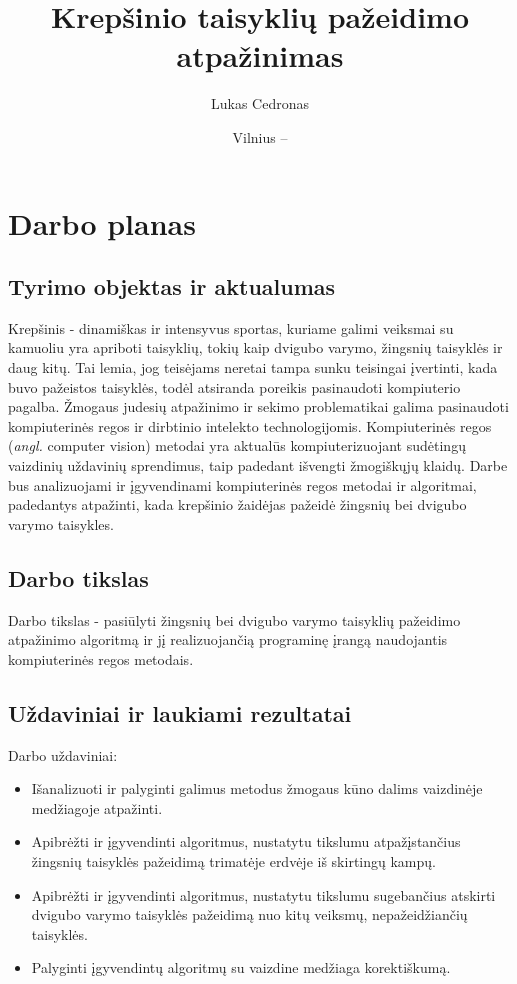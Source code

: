 \documentclass{VUMIFPSbakalaurinis}
\institute{Informatikos institutas}  %
\title{Krepšinio taisyklių pažeidimo atpažinimas}
\author{Lukas Cedronas}
\date{Vilnius – \the\year}
\begin{document}
\maketitle


\section{Darbo planas}

\subsection{Tyrimo objektas ir aktualumas}
Krepšinis - dinamiškas ir intensyvus sportas, kuriame galimi veiksmai su kamuoliu yra apriboti taisyklių, tokių kaip dvigubo varymo, žingsnių taisyklės ir daug kitų. Tai lemia, jog teisėjams neretai tampa sunku teisingai įvertinti, kada buvo pažeistos taisyklės, todėl atsiranda poreikis pasinaudoti kompiuterio pagalba. Žmogaus judesių atpažinimo ir sekimo problematikai galima pasinaudoti kompiuterinės regos ir dirbtinio intelekto technologijomis. Kompiuterinės regos (\textit{angl.} computer vision) metodai yra aktualūs kompiuterizuojant sudėtingų vaizdinių uždavinių sprendimus, taip padedant išvengti žmogiškųjų klaidų. Darbe bus analizuojami ir įgyvendinami kompiuterinės regos metodai ir algoritmai, padedantys atpažinti, kada krepšinio žaidėjas pažeidė žingsnių bei dvigubo varymo taisykles. 

\subsection{Darbo tikslas}
Darbo tikslas - pasiūlyti žingsnių bei dvigubo varymo taisyklių pažeidimo atpažinimo algoritmą ir jį realizuojančią programinę įrangą naudojantis kompiuterinės regos metodais.

\subsection{Uždaviniai ir laukiami rezultatai}
Darbo uždaviniai:
\begin{itemize}[topsep=5pt,itemsep=-1ex,partopsep=2ex,parsep=2ex]
 \item Išanalizuoti ir palyginti galimus metodus žmogaus kūno dalims vaizdinėje medžiagoje atpažinti.
 \item Apibrėžti ir įgyvendinti algoritmus, nustatytu tikslumu atpažįstančius žingsnių taisyklės pažeidimą trimatėje erdvėje iš skirtingų kampų.
 \item Apibrėžti ir įgyvendinti algoritmus, nustatytu tikslumu sugebančius atskirti dvigubo varymo taisyklės pažeidimą nuo kitų veiksmų, nepažeidžiančių taisyklės.
 \item Palyginti įgyvendintų algoritmų su vaizdine medžiaga korektiškumą. 
\end{itemize}
\end{document}
